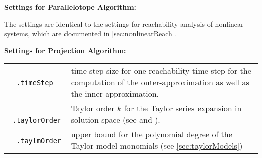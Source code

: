 \textbf{Settings for Parallelotope Algorithm:}

The settings are identical to the settings for reachability analysis of nonlinear systems, which are documented in \cref{sec:nonlinearReach}.


\vspace{1cm}

\textbf{Settings for Projection Algorithm:}

\begin{center}
\renewcommand{\arraystretch}{1.3}
\begin{longtable}[t]{l p{13cm}}	
	--~\texttt{.timeStep} & time step size for one reachability time step for the computation of the outer-approximation as well as the inner-approximation. \\
	--~\texttt{.taylorOrder} & Taylor order $k$ for the Taylor series expansion in solution space (see \cite[Eq. (6)]{Goubault2017} and \cite[Alg. 1]{Goubault2017}). \\
	--~\texttt{.taylmOrder} &  upper bound for the polynomial degree of the Taylor model monomials (see \cref{sec:taylorModels}) \\
\end{longtable}
\end{center}
